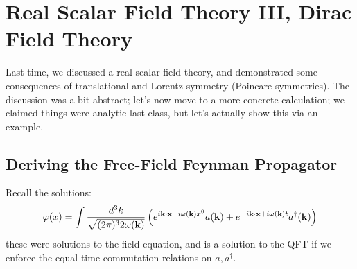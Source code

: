 \section{Real Scalar Field Theory III, Dirac Field Theory}
Last time, we discussed a real scalar field theory, and demonstrated some consequences of translational and Lorentz symmetry (Poincare symmetries). The discussion was a bit abstract; let's now move to a more concrete calculation; we claimed things were analytic last class, but let's actually show this via an example.

\subsection{Deriving the Free-Field Feynman Propagator}
Recall the solutions:
\begin{equation}
    \varphi(x) = \int \frac{d^3k}{\sqrt{(2\pi)^32\omega(\v{k})}} \left(e^{i\v{k} \cdot \v{x} - i\omega(\v{k})x^0}a(\v{k}) + e^{-i\v{k}\cdot\v{x} + i\omega(\v{k})t}a^\dag(\v{k})\right)
\end{equation}
these were solutions to the field equation, and is a solution to the QFT if we enforce the equal-time commutation relations on $a, a^\dag$.

